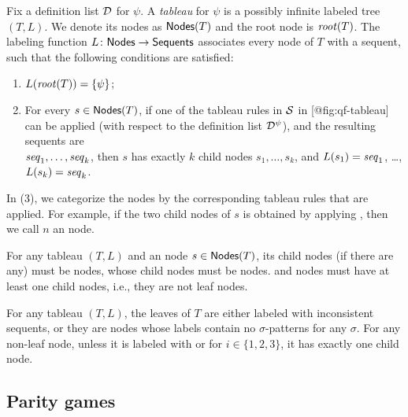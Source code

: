 \begin{definition}[Tableaux]\label{def:tableau}
Fix a definition list \(\mathcal D\) for \(\psi\).
A \emph{tableau} for \(\psi\) is a possibly infinite labeled tree
\((T,L)\).
We denote its nodes as \(\mathsf{Nodes}(T)\) and the root node is \(\mathit{root}(T)\).
The labeling function \(L \colon \mathsf{Nodes} \to \mathsf{Sequents}\)
associates every node of \(T\) with a sequent, such that the following conditions
are satisfied:

\begin{enumerate}
\def\labelenumi{\arabic{enumi}.}
\tightlist
\item
  \(L(\mathit{root}(T)) = \{ \psi \}\);
\item
  For every \(s \in \mathsf{Nodes}(T)\), if one of the tableau rules in \(\mathcal{S}\) in {[}@fig:qf-tableau{]} can be applied (with respect to the
  definition list \(\mathcal D^\psi\)), and the resulting sequents are\\
  \(\mathit{seq}_1,\dots,\mathit{seq}_k\), then
  \(s\) has exactly \(k\) child nodes \(s_1,\dots,s_k\), and
  \(L(s_1) = \mathit{seq}_1\), \dots, \(L(s_k) = \mathit{seq}_k\).
\end{enumerate}

\end{definition}

In (3), we categorize the nodes by the corresponding tableau rules that are
applied.
For example, if the two child nodes of \(s\) is obtained by applying ,
then we call \(n\) an  node.

\begin{remark}
For any tableau $(T,L)$ and an \appa{} node $s \in \mathsf{Nodes}(T)$,
its child nodes (if there are any) must be \appb{} nodes, 
whose child nodes must be \appc{} nodes.
\appb{} and \appc{} nodes must have at least one child nodes,
i.e., they are not leaf nodes. 
\end{remark}

\begin{remark}
For any tableau $(T,L)$, the leaves of $T$
are either labeled with inconsistent sequents, or they are
\appa{} nodes whose labels contain no $\sigma$-patterns for any 
$\sigma$.
For any non-leaf node, unless it is labeled with  or  
for $i \in \{1,2,3\}$,
it has exactly one child node. 
\end{remark}

\hypertarget{parity-games}{%
\subsection{Parity games}\label{parity-games}}

